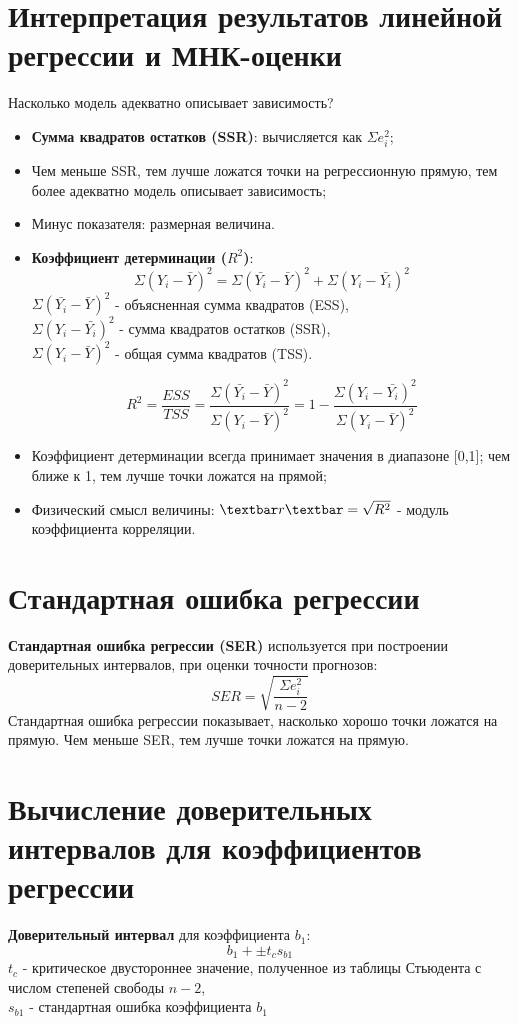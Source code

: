 \documentclass{article}
\begin{document}
\section{Интерпретация результатов линейной регрессии и МНК-оценки}\label{sec:int}
Насколько модель адекватно описывает зависимость?
\begin{itemize}
    \item \textbf{Сумма квадратов остатков (SSR)}: вычисляется как \(\Sigma e_i^2\);
    \item Чем меньше SSR, тем лучше ложатся точки на регрессионную прямую, тем более адекватно модель описывает зависимость;
    \item Минус показателя: размерная величина. 
    \item \textbf{Коэффициент детерминации (\(R^2\))}:
    \[\Sigma(Y_i - \bar{Y})^2 = \Sigma (\bar{Y_i} - \bar{Y})^2 + \Sigma(Y_i - \bar{Y_i})^2 \]
    \(\Sigma(\bar{Y_i} - \bar{Y})^2\) - объясненная сумма квадратов (ESS), \\
    \(\Sigma(Y_i - \bar{Y_i})^2\) - сумма квадратов остатков (SSR), \\
    \(\Sigma(Y_i - \bar{Y})^2\) - общая сумма квадратов (TSS).
    
    \[R^2 = \frac{ESS}{TSS} = \frac{\Sigma (\bar{Y_i} - \bar{Y})^2}{\Sigma(Y_i - \bar{Y})^2} = 1 - \frac{\Sigma(Y_i - \bar{Y_i})^2}{\Sigma(Y_i - \bar{Y})^2}\]
    
    \item Коэффициент детерминации всегда принимает значения в диапазоне [0,1]; чем ближе к 1, тем лучше точки ложатся на прямой;
    \item Физический смысл величины: \(\textbar r \textbar = \sqrt{R^2} \) - модуль коэффициента корреляции. 
\end{itemize}

\section{Стандартная ошибка регрессии}\label{sec:st-error}
\textbf{Стандартная ошибка регрессии (SER)} используется при построении доверительных интервалов, при оценки точности прогнозов:
\[SER = \sqrt{\frac{\Sigma e_i^2}{n - 2}} \]
Стандартная ошибка регрессии показывает, насколько хорошо точки ложатся на прямую.
Чем меньше SER, тем лучше точки ложатся на прямую.

\section{Вычисление доверительных интервалов для коэффициентов регрессии}\label{sec:conf-int}
\textbf{Доверительный интервал} для коэффициента \(b_1\): 
\[b_1 + \pm t_cs_{b1} \]
\(t_c\) - критическое двустороннее значение, полученное из таблицы Стьюдента с числом степеней свободы \(n-2\), \\
\(s_{b1}\) - стандартная ошибка коэффициента \(b_1\)
\end{document}
